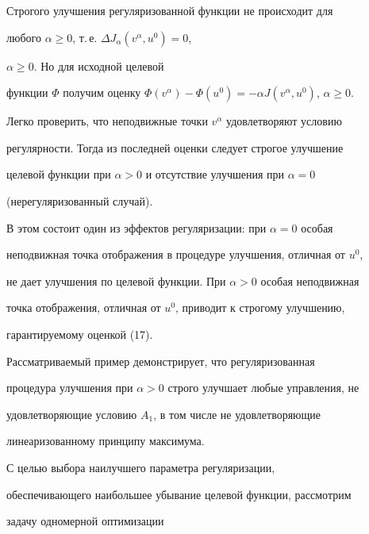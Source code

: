 \begin{exam}
 


Строгого улучшения регуляризованной функции не происходит для 


любого $\alpha\ge0$, т.\,е. $\Delta J_\alpha(v^\alpha,u^0)=0$, 


$\alpha\ge0$. Но для исходной целевой 


функции $\Phi$ получим оценку $\Phi(v^\alpha)-\Phi(u^0)=-\alpha 


J(v^\alpha,u^0)$, $\alpha\ge0$. 


 


Легко проверить, что неподвижные точки $v^\alpha$ удовлетворяют условию 


регулярности. Тогда из последней оценки следует строгое улучшение 


целевой функции при $\alpha>0$ и отсутствие улучшения при $\alpha=0$ 


(нерегуляризованный случай). 


 


В этом состоит один из эффектов регуляризации: при $\alpha=0$ особая 


неподвижная точка отображения в процедуре улучшения, отличная от $u^0$, 


не дает улучшения по целевой функции. При $\alpha>0$ особая неподвижная 


точка отображения, отличная от $u^0$, приводит к строгому улучшению, 


гарантируемому оценкой (17). 


 


Рассматриваемый пример демонстрирует, что регуляризованная 


процедура улучшения при $\alpha>0$ строго улучшает любые управления, не 


удовлетворяющие условию $A_1$, в том числе не удовлетворяющие 


линеаризованному принципу максимума. 


\end{exam} 


 


С целью выбора наилучшего параметра регуляризации, 


обеспечивающего наибольшее убывание целевой функции, рассмотрим 


задачу одномерной оптимизации 


$$ 


